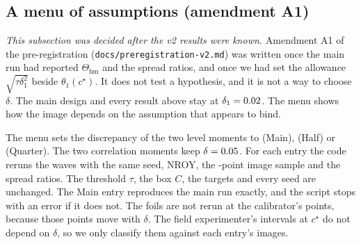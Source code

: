 \documentclass[11pt]{article}
\newcommand{\hm}{\mathrm{hm}}
\begin{document}
\subsection{A menu of assumptions (amendment A1)}
\label{sec:menu}
\emph{This subsection was decided after the v2 results were known.}
Amendment A1 of the pre-registration (\texttt{docs/preregistration-v2.md}) was
written once the main run had reported $\Theta_{\hm}$ and the spread ratios,
and once we had set the allowance $\sqrt{\tau\delta_1^2}$ beside
$\theta_1(c^\star)$. It does not test a hypothesis, and it is not a way to
choose $\delta$. The main design and every result above stay at
$\delta_1=0.02$. The menu shows how the image depends on the
assumption that appears to bind.

The menu sets the discrepancy of the two level moments to
\MenuDeltaMainLevel{} (Main), \MenuDeltaHalfLevel{} (Half) or
\MenuDeltaQuarterLevel{} (Quarter). The two correlation moments keep
$\delta=0.05$. For each entry the code reruns the waves with the same
seed, NROY, the \ThetaSample-point image sample and the spread ratios. The
threshold $\tau$, the box $C$, the targets and every seed are unchanged.
The Main entry reproduces the main run exactly, and the script stops with an
error if it does not. The foils are not rerun at the calibrator's points,
because those points move with $\delta$. The field experimenter's intervals
at $c^\star$ do not depend on $\delta$, so we only classify them against each
entry's images.
\end{document}
